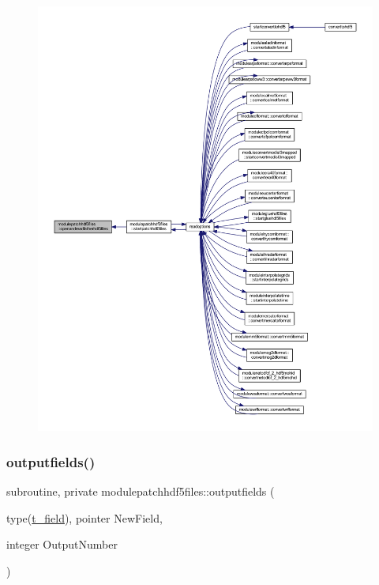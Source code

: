 \begin{figure}[H]
\begin{center}
\leavevmode
\includegraphics[width=350pt]{namespacemodulepatchhdf5files_aa13f313e5bea3ff364240319fb791f70_icgraph}
\end{center}
\end{figure}
\mbox{\label{namespacemodulepatchhdf5files_a32322a9b20e258cf772b50096c520369}} 
\subsubsection{\texorpdfstring{outputfields()}{outputfields()}}
{\footnotesize\ttfamily subroutine, private modulepatchhdf5files\+::outputfields (\begin{DoxyParamCaption}\item[{type(\mbox{\hyperlink{structmodulepatchhdf5files_1_1t__field}{t\+\_\+field}}), pointer}]{New\+Field,  }\item[{integer}]{Output\+Number }\end{DoxyParamCaption})\hspace{0.3cm}{\ttfamily [private]}}

